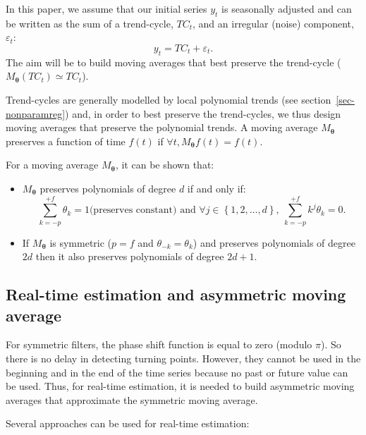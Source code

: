\documentclass[
]{article}
\providecommand{\tightlist}{%
  \setlength{\itemsep}{0pt}\setlength{\parskip}{0pt}}\usepackage{longtable,booktabs,array}
\newcommand\1{\mathds{1}}
\begin{document}
In this paper, we assume that our initial series \(y_t\) is seasonally
adjusted and can be written as the sum of a trend-cycle, \(TC_t\), and
an irregular (noise) component, \(\varepsilon_t\): \[
y_t=TC_t+\varepsilon_t.
\] The aim will be to build moving averages that best preserve the
trend-cycle (\(M_{\boldsymbol\theta} (TC_t)\simeq TC_t\)).

Trend-cycles are generally modelled by local polynomial trends (see
section~\ref{sec-nonparamreg}) and, in order to best preserve the
trend-cycles, we thus design moving averages that preserve the
polynomial trends. A moving average \(M_{\boldsymbol\theta}\) preserves
a function of time \(f(t)\) if
\(\forall t,M_{\boldsymbol\theta} f(t)=f(t)\).

For a moving average \(M_{\boldsymbol\theta}\), it can be shown that:

\begin{itemize}
\tightlist
\item
  \(M_{\boldsymbol\theta}\) preserves polynomials of degree \(d\) if and
  only if: \[
  \sum_{k=-p}^{+f}\theta_k=1
   \text{(preserves constant) and }
  \forall j \in \left\{1,2,\dots,d\right\},\:
  \sum_{k=-p}^{+f}k^j\theta_k=0.
  \]
\item
  If \(M_{\boldsymbol\theta}\) is symmetric (\(p=f\) and
  \(\theta_{-k} = \theta_k\)) and preserves polynomials of degree \(2d\)
  then it also preserves polynomials of degree \(2d+1\).
\end{itemize}

\subsection{Real-time estimation and asymmetric moving
average}\label{sec-mmasym}

For symmetric filters, the phase shift function is equal to zero (modulo
\(\pi\)). So there is no delay in detecting turning points. However,
they cannot be used in the beginning and in the end of the time series
because no past or future value can be used. Thus, for real-time
estimation, it is needed to build asymmetric moving averages that
approximate the symmetric moving average.

Several approaches can be used for real-time estimation:
\end{document}
